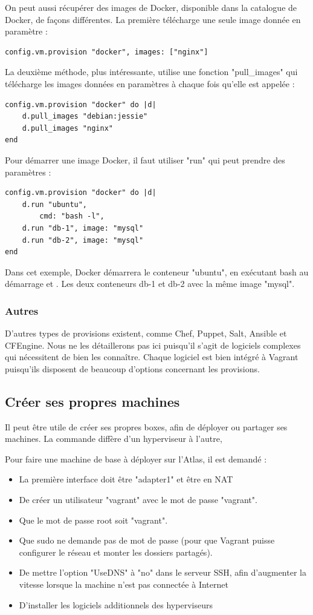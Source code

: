 \documentclass[12pt,a4paper]{article}
\begin{document}
On peut aussi récupérer des images de Docker, disponible dans la catalogue de Docker, de façons différentes. La première télécharge une seule image donnée en paramètre :
\begin{lstlisting}
config.vm.provision "docker", images: ["nginx"]
\end{lstlisting}
La deuxième méthode, plus intéressante, utilise une fonction "pull\_images" qui télécharge les images données en paramètres à chaque fois qu'elle est appelée : 
\begin{lstlisting}
config.vm.provision "docker" do |d|
	d.pull_images "debian:jessie"
	d.pull_images "nginx"
end
\end{lstlisting}

Pour démarrer une image Docker, il faut utiliser "run" qui peut prendre des paramètres :
\begin{lstlisting}
config.vm.provision "docker" do |d|
	d.run "ubuntu",
		cmd: "bash -l",
	d.run "db-1", image: "mysql"
	d.run "db-2", image: "mysql"
end
\end{lstlisting}
Dans cet exemple, Docker démarrera le conteneur "ubuntu", en exécutant bash au démarrage et . Les deux conteneurs db-1 et db-2 avec la même image "mysql".

\subsubsection{Autres}

D'autres types de provisions existent, comme Chef, Puppet, Salt, Ansible et CFEngine. Nous ne les détaillerons pas ici puisqu'il s'agit de logiciels complexes qui nécessitent de bien les connaître. Chaque logiciel est bien intégré à Vagrant puisqu'ils disposent de beaucoup d'options concernant les provisions.

\subsection{Créer ses propres machines}
Il peut être utile de créer ses propres boxes, afin de déployer ou partager ses machines. La commande diffère d'un hyperviseur à l'autre, 

Pour faire une machine de base à déployer sur l'Atlas, il est demandé :
\begin{itemize}
	\item{La première interface doit être "adapter1" et être en NAT}
	\item{De créer un utilisateur "vagrant" avec le mot de passe "vagrant".}
	\item{Que le mot de passe root soit "vagrant".}
	\item{Que sudo ne demande pas de mot de passe (pour que Vagrant puisse configurer le réseau et monter les dossiers partagés).}
	\item{De mettre l'option "UseDNS" à "no" dans le serveur SSH, afin d'augmenter la vitesse lorsque la machine n'est pas connectée à Internet}
	\item{D'installer les logiciels additionnels des hyperviseurs}
\end{itemize}
\end{document}
